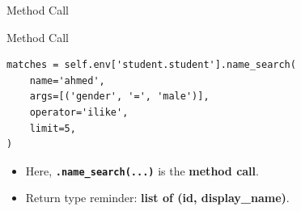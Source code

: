 \begin{frame}[fragile]{Method Call}
\begin{block}{Method Call}
\begin{lstlisting}
matches = self.env['student.student'].name_search(
	name='ahmed',
	args=[('gender', '=', 'male')],
	operator='ilike',
	limit=5,
)
\end{lstlisting}
	\begin{itemize}
		\item Here, \textbf{\texttt{.name\_search(...)}} is the \textbf{method call}.
		\item Return type reminder: \textbf{list of (id, display\_name)}.
	\end{itemize}
\end{block}
\end{frame}

